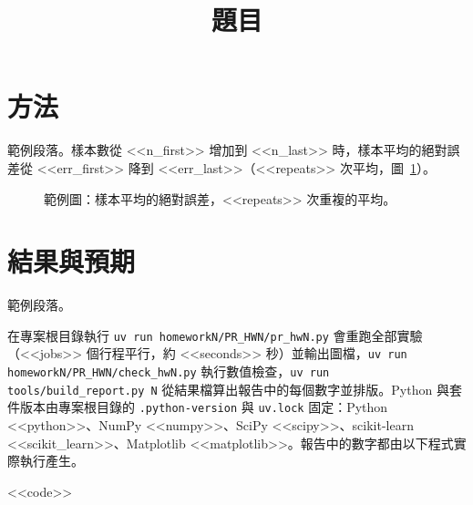 \documentclass{prhw}
\title{題目}
\begin{document}
\maketitle

\section{方法}
\noindent 範例段落。樣本數從 <<n_first>> 增加到 <<n_last>> 時，樣本平均的絕對誤差從 <<err_first>> 降到 <<err_last>>（<<repeats>> 次平均，圖~\ref{fig:example}）。

\begin{figure}[!htb]
\centering{}
\caption{範例圖：樣本平均的絕對誤差，<<repeats>> 次重複的平均。}\label{fig:example}
\end{figure}

\section{結果與預期}
\noindent 範例段落。

\codeappendix
\noindent 在專案根目錄執行 \texttt{uv run homeworkN/PR\_HWN/pr\_hwN.py} 會重跑全部實驗（<<jobs>> 個行程平行，約 <<seconds>> 秒）並輸出圖檔，\texttt{uv run homeworkN/PR\_HWN/check\_hwN.py} 執行數值檢查，\texttt{uv run tools/build\_report.py N} 從結果檔算出報告中的每個數字並排版。Python 與套件版本由專案根目錄的 \texttt{.python-version} 與 \texttt{uv.lock} 固定：Python <<python>>、NumPy <<numpy>>、SciPy <<scipy>>、scikit-learn <<scikit_learn>>、Matplotlib <<matplotlib>>。報告中的數字都由以下程式實際執行產生。

<<code>>
\end{document}
